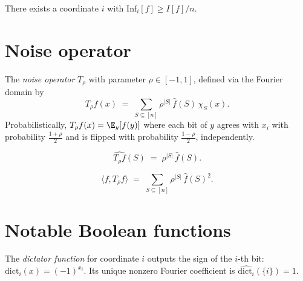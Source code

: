 \begin{lemma}
\leanok
{}
There exists a coordinate $i$ with $\mathrm{Inf}_i[f] \ge I[f]/n$.
\end{lemma}

\section{Noise operator}

\begin{definition}
\leanok
{}
The \emph{noise operator} $T_\rho$ with parameter $\rho\in[-1,1]$, defined via
the Fourier domain by
\[
  T_\rho f(x) \;=\; \sum_{S\subseteq[n]} \rho^{|S|}\,\hat f(S)\,\chi_S(x).
\]
Probabilistically, $T_\rho f(x) = \E_y[f(y)]$ where each bit of $y$ agrees
with $x_i$ with probability $\tfrac{1+\rho}{2}$ and is flipped with probability
$\tfrac{1-\rho}{2}$, independently.
\end{definition}

\begin{theorem}
\leanok
{}
\[
  \widehat{T_\rho f}(S) \;=\; \rho^{|S|}\,\hat f(S).
\]
\end{theorem}

\begin{theorem}
\leanok
{}
\[
  \langle f, T_\rho f\rangle \;=\; \sum_{S\subseteq[n]} \rho^{|S|}\,\hat f(S)^2.
\]
\end{theorem}

\section{Notable Boolean functions}

\begin{definition}[Dictator]
\leanok
{}
The \emph{dictator function} for coordinate $i$ outputs the sign of the $i$-th
bit: $\mathrm{dict}_i(x) = (-1)^{x_i}$.  Its unique nonzero Fourier coefficient
is $\widehat{\mathrm{dict}_i}(\{i\}) = 1$.
\end{definition}

